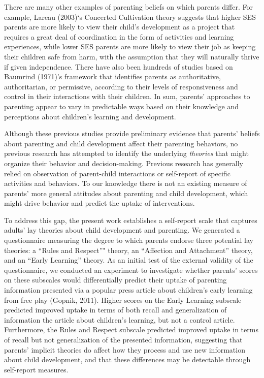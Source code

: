 \documentclass[10pt, letterpaper]{article}
\begin{document}
There are many other examples of parenting beliefs on which parents
differ. For example, Lareau (2003)`s Concerted Cultivation theory
suggests that higher SES parents are more likely to view their child's
development as a project that requires a great deal of coordination in
the form of activities and learning experiences, while lower SES parents
are more likely to view their job as keeping their children safe from
harm, with the assumption that they will naturally thrive if given
independence. There have also been hundreds of studies based on Baumrind
(1971)'s framework that identifies parents as authoritative,
authoritarian, or permissive, according to their levels of
responsiveness and control in their interactions with their children. In
sum, parents' approaches to parenting appear to vary in predictable ways
based on their knowledge and perceptions about children's learning and
development.

Although these previous studies provide preliminary evidence that
parents' beliefs about parenting and child development affect their
parenting behaviors, no previous research has attempted to identify the
underlying \emph{theories} that might organize their behavior and
decision-making. Previous research has generally relied on observation
of parent-child interactions or self-report of specific activities and
behaviors. To our knowledge there is not an existing measure of parents'
more general attitudes about parenting and child development, which
might drive behavior and predict the uptake of interventions.

To address this gap, the present work establishes a self-report scale
that captures adults' lay theories about child development and
parenting. We generated a questionnaire measuring the degree to which
parents endorse three potential lay theories: a ``Rules and Respect''"
theory, an ``Affection and Attachment'' theory, and an ``Early
Learning'' theory. As an initial test of the external validity of the
questionnaire, we conducted an experiment to investigate whether
parents' scores on these subscales would differentially predict their
uptake of parenting information presented via a popular press article
about children's early learning from free play (Gopnik, 2011). Higher
scores on the Early Learning subscale predicted improved uptake in terms
of both recall and generalization of information the article about
children's learning, but not a control article. Furthermore, the Rules
and Respect subscale predicted improved uptake in terms of recall but
not generalization of the presented information, suggesting that
parents' implicit theories do affect how they process and use new
information about child development, and that these differences may be
detectable through self-report measures.
\end{document}
